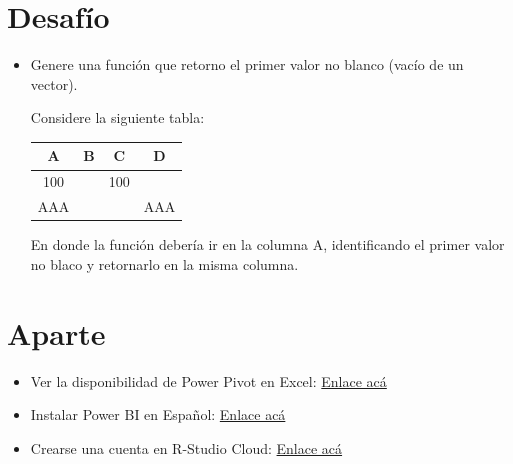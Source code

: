 \documentclass[12 pt,letterpaper]{article}
\begin{document}
\section{Desafío \faWarning}

\begin{itemize}
	\item Genere una función que retorno el primer valor no blanco (vacío de un vector). 
	
	Considere la siguiente tabla:
	
	\begin{center}
	\begin{tabular}{|c|c|c|c|}
		\hline
		A & B & C & D \\
		\hline
		100 &  & 100 &  \\
		\hline
		AAA &  &  & AAA \\
		\hline
	\end{tabular}
	\end{center}
	
	En donde la función debería ir en la columna A, identificando el primer valor no blaco y retornarlo en la misma columna. 
	
\end{itemize}

\section{Aparte}

\begin{itemize}
	\item Ver la disponibilidad de Power Pivot en Excel: \href{https://support.microsoft.com/es-es/office/iniciar-el-complemento-power-pivot-para-excel-a891a66d-36e3-43fc-81e8-fc4798f39ea8}{Enlace acá}	
	
	\item Instalar Power BI en Español: \href{https://powerbi.microsoft.com/es-es/desktop/}{Enlace acá}
	
	\item Crearse una cuenta en R-Studio Cloud: \href{https://rstudio.cloud/}{Enlace acá}
		
\end{itemize}
\end{document}
